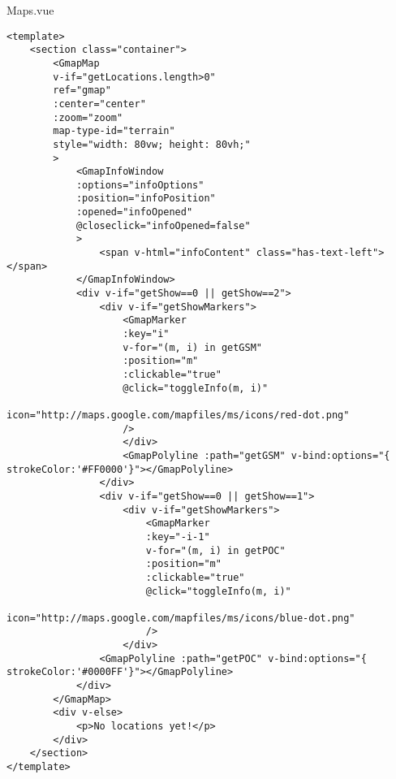 Maps.vue
\begin{lstlisting}
<template>
	<section class="container">
		<GmapMap
		v-if="getLocations.length>0"
		ref="gmap"
		:center="center"
		:zoom="zoom"
		map-type-id="terrain"
		style="width: 80vw; height: 80vh;"
		>
			<GmapInfoWindow
			:options="infoOptions"
			:position="infoPosition"
			:opened="infoOpened"
			@closeclick="infoOpened=false"
			>
				<span v-html="infoContent" class="has-text-left"></span>
			</GmapInfoWindow>
			<div v-if="getShow==0 || getShow==2">
				<div v-if="getShowMarkers">
					<GmapMarker
					:key="i"
					v-for="(m, i) in getGSM"
					:position="m"
					:clickable="true"
					@click="toggleInfo(m, i)"
					icon="http://maps.google.com/mapfiles/ms/icons/red-dot.png"
					/>
					</div>
					<GmapPolyline :path="getGSM" v-bind:options="{ strokeColor:'#FF0000'}"></GmapPolyline>
				</div>
				<div v-if="getShow==0 || getShow==1">
					<div v-if="getShowMarkers">
						<GmapMarker
						:key="-i-1"
						v-for="(m, i) in getPOC"
						:position="m"
						:clickable="true"
						@click="toggleInfo(m, i)"
						icon="http://maps.google.com/mapfiles/ms/icons/blue-dot.png"
						/>
					</div>
				<GmapPolyline :path="getPOC" v-bind:options="{ strokeColor:'#0000FF'}"></GmapPolyline>
			</div>
		</GmapMap>
		<div v-else>
			<p>No locations yet!</p>
		</div>
	</section>
</template>


\end{lstlisting}
